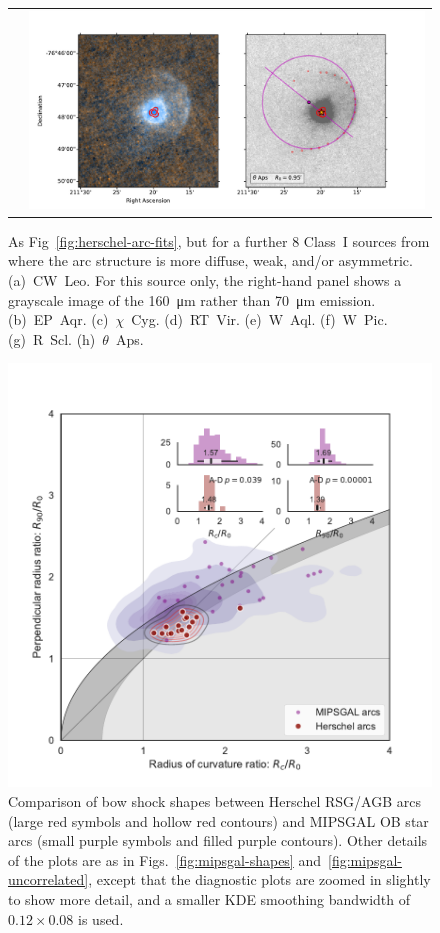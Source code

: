 \begin{figure}
\begin{tabular}{@{}ll@{}}
    & \includegraphics[trim=10 0 60 30, clip]{figs/tetaps-imageplot}
  \end{tabular}
  \caption{As Fig~\ref{fig:herschel-arc-fits}, but for a further 8
    Class~I sources from \citet{Cox:2012a} where the arc structure is
    more diffuse, weak, and/or asymmetric. (a)~CW~Leo. For this source
    only, the right-hand panel shows a grayscale image of the
    \SI{160}{\um} rather than \SI{70}{\um}
    emission. (b)~EP~Aqr. (c)~\(\chi\)~Cyg. (d)~RT~Vir. (e)~W~Aql. (f)~W~Pic. (g)~R~Scl.
    (h)~\(\theta\)~Aps.}
  \label{fig:herschel-arc-fits-poor}
\end{figure}


\begin{figure}
  \centering
  \includegraphics[width=0.8\linewidth]{figs/mipsgal-Rc-R90-vs-Herschel}
  \caption[]{Comparison of bow shock shapes between Herschel RSG/AGB
    arcs (large red symbols and hollow red contours) and MIPSGAL OB
    star arcs (small purple symbols and filled purple contours).
    Other details of the plots are as in
    Figs.~\ref{fig:mipsgal-shapes} and~\ref{fig:mipsgal-uncorrelated},
    except that the diagnostic plots are zoomed in slightly to show
    more detail, and a smaller KDE smoothing bandwidth of
    \(0.12 \times 0.08\) is used.}
  \label{fig:herschel-compare-mipsgal}
\end{figure}

